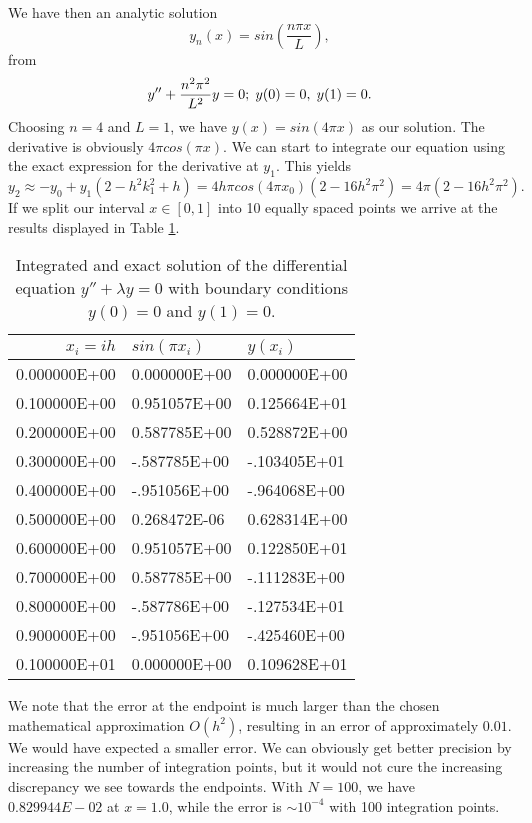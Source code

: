 We have then an analytic solution
\[
y_n(x) = sin(\frac{n\pi x}{L}),
\]
from 
\[
   y''+\frac{n^2\pi^2}{L^2} y=0; \hspace{0.1cm} y(0) =0, \hspace{0.1cm}  y(1) = 0.
\]
Choosing $n=4$ and $L=1$, we have $y(x)=sin(4\pi x)$ as our solution. 
The derivative is obviously $4\pi cos(\pi x)$.
We can start to integrate  our equation using the exact expression for the derivative at
$y_1$. This yields
\[
     y_{2}\approx -y_{0}+y_1\left(2-h^2k^2_1+h\right)=4h\pi cos(4\pi x_0)\left(2-16h^2\pi^2\right)=4\pi \left(2-16h^2\pi^2\right).
\]
If we split our interval $x\in [0,1]$ into 10 equally spaced points we arrive at the results
displayed in Table \ref{tab:numdiff1}.
\begin{table}[t]
\begin{center}
\caption{Integrated and exact solution of the differential equation $y''+\lambda y=0$ 
with boundary conditions $y(0) =0$ and $y(1) = 0$. \label{tab:numdiff1}} 
\begin{tabular}{rll}\hline
$x_i=ih$&$sin(\pi x_i)$&$y(x_i)$\\\hline
0.000000E+00 &0.000000E+00 &0.000000E+00\\
0.100000E+00 &0.951057E+00 &0.125664E+01\\
0.200000E+00 &0.587785E+00 &0.528872E+00\\
0.300000E+00 &-.587785E+00 &-.103405E+01\\
0.400000E+00 &-.951056E+00 &-.964068E+00\\
0.500000E+00 &0.268472E-06 &0.628314E+00\\
0.600000E+00 &0.951057E+00 &0.122850E+01\\
0.700000E+00 &0.587785E+00 &-.111283E+00\\
0.800000E+00 &-.587786E+00 &-.127534E+01\\
0.900000E+00 &-.951056E+00 &-.425460E+00\\
0.100000E+01 &0.000000E+00 &0.109628E+01\\
\hline
\end{tabular} 
\end{center}   
\end{table}     
We note that the error at the endpoint is much larger  than the 
chosen mathematical approximation $O(h^2)$, resulting in an error of approximately $0.01$. 
We would have expected a smaller error.
We can obviously 
get better precision by increasing the number of integration points, but it would not cure
the increasing discrepancy we see towards the endpoints.   With $N=100$, we have 
$0.829944E-02$ at $x=1.0$, while the error is $\sim 10^{-4}$ with 100 integration points.

